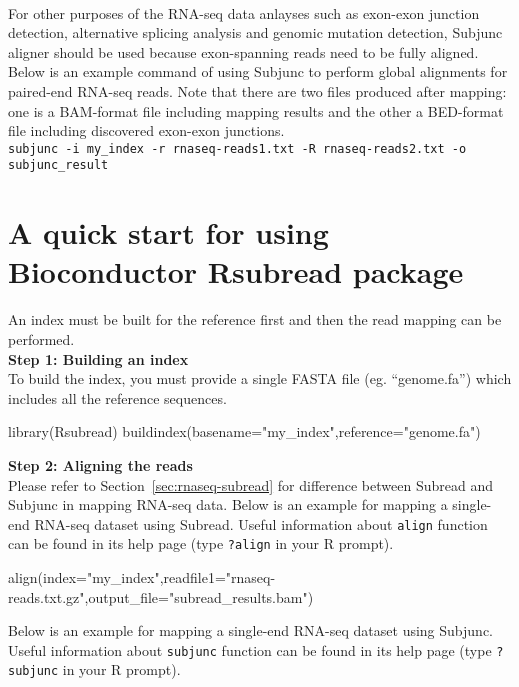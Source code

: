 \documentclass[12pt]{report}
\newcommand{\code}[1]{{\small\texttt{#1}}}
\newcommand{\Subread}{\textsf{Subread}}
\newcommand{\Subjunc}{\textsf{Subjunc}}
\newcommand{\Rsubread}{\textsf{Rsubread}}
\newcommand{\R}{\textsf{R}}
\begin{document}
\noindent{{\Subjunc}}\\

For other purposes of the RNA-seq data anlayses such as exon-exon junction detection, alternative splicing analysis and genomic mutation detection, {\Subjunc} aligner should be used because exon-spanning reads need to be fully aligned.
Below is an example command of using {\Subjunc} to perform global alignments for paired-end RNA-seq reads.
Note that there are two files produced after mapping: one is a BAM-format file including mapping results and the other a BED-format file including discovered exon-exon junctions.\\

\code{subjunc -i my\_index -r rnaseq-reads1.txt -R rnaseq-reads2.txt -o subjunc\_result}

\section{A quick start for using Bioconductor {\Rsubread} package}

An index must be built for the reference first and then the read mapping can be performed.\\

{\noindent\bf Step 1: Building an index}\\

\noindent To build the index, you must provide a single FASTA file (eg. ``genome.fa'') which includes all the reference sequences.

\begin{Rcode}
library(Rsubread)
buildindex(basename="my_index",reference="genome.fa")
\end{Rcode}

{\noindent\bf Step 2: Aligning the reads}\\

Please refer to Section~\ref{sec:rnaseq-subread} for difference between {\Subread} and {\Subjunc} in mapping RNA-seq data.
Below is an example for mapping a single-end RNA-seq dataset using {\Subread}.
Useful information about \code{align} function can be found in its help page (type \code{?align} in your {\R} prompt).

\begin{Rcode}
align(index="my_index",readfile1="rnaseq-reads.txt.gz",output_file="subread_results.bam")
\end{Rcode}

Below is an example for mapping a single-end RNA-seq dataset using {\Subjunc}.
Useful information about \code{subjunc} function can be found in its help page (type \code{?subjunc} in your {\R} prompt).
\end{document}
